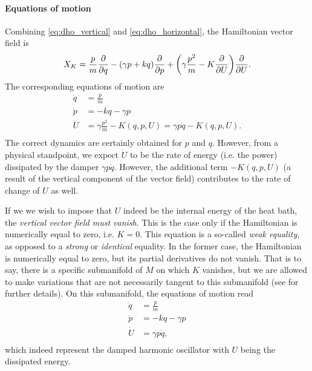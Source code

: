 \paragraph{Equations of motion} Combining \cref{eq:dho_vertical} and \cref{eq:dho_horizontal}, the Hamiltonian vector field is
$$ X_K = \frac{p}{m}\pdv{}{q} - (\gamma p + kq)\pdv{}{p} + \qty(\gamma \frac{p^2}{m} - K\pdv{}{U})\pdv{}{U}.$$
The corresponding equations of motion are 
\begin{equation}
    \begin{split}
        \dot{q} &= \frac{p}{m} \\
        \dot{p} &= -kq -\gamma p \\
        \dot{U} &= \gamma \frac{p^2}{m} - K(q, p, U) = \gamma p\dot{q} - K(q, p, U). \\
    \end{split}
\end{equation}
The correct dynamics are certainly obtained for $p$ and $q$. However, from a physical standpoint, we expect $\dot{U}$ to be the rate of energy (i.e. the power) dissipated by the damper $\gamma p \dot{q}$. However, the additional term $-K(q, p, U)$ (a result of the vertical component of the vector field) contributes to the rate of change of $U$ as well.

If we we wish to impose that $U$ indeed be the internal energy of the heat bath, the \emph{vertical vector field must vanish}. This is the case only if the Hamiltonian is numerically equal to zero, i.e. $K = 0$. This equation is a so-called \emph{weak equality}, as opposed to a \emph{strong} or \emph{identical} equality. In the former case, the Hamiltonian is numerically equal to zero, but its partial derivatives do not vanish. That is to say, there is a specific submanifold of $M$ on which $K$ vanishes, but we are allowed to make variations that are not necessarily tangent to this submanifold (see \citet{Dirac1950} for further details). On this submanifold, the equations of motion read
\begin{equation}
    \begin{split}
        \dot{q} &= \frac{p}{m} \\
        \dot{p} &= -kq -\gamma p \\
        \dot{U} &= \gamma p\dot{q},\\
    \end{split}
\end{equation}
which indeed represent the damped harmonic oscillator with $U$ being the dissipated energy.

